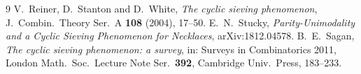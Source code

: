 \documentclass[11pt,a4paper]{article}
\theoremstyle{plain}
\theoremstyle{definition}
\theoremstyle{remark}
\begin{document}
\begin{thebibliography}{9}
 V.~Reiner, D.~Stanton and D.~White,
  \emph{The cyclic sieving phenomenon},
  J.\ Combin.\ Theory Ser.\ A \textbf{108} (2004), 17--50.
 E.~N.~Stucky,
  \emph{Parity-Unimodality and a Cyclic Sieving Phenomenon for Necklaces},
  arXiv:1812.04578.
 B.~E.~Sagan,
  \emph{The cyclic sieving phenomenon: a survey},
  in: Surveys in Combinatorics 2011, London Math.\ Soc.\ Lecture Note Ser.\ \textbf{392},
  Cambridge Univ.\ Press, 183--233.
\end{thebibliography}
\end{document}
